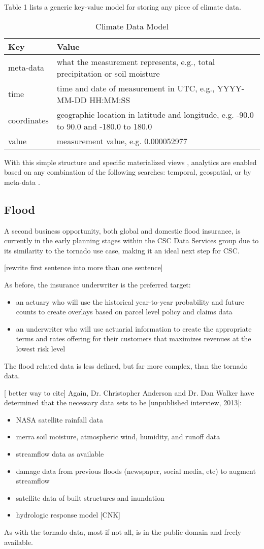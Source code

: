 Table 1 lists a generic key-value model for storing any piece of climate data.
\begin{table}[htbp]
	\caption{Climate Data Model}
	\centering
	\begin{tabular}{l l}
		\hline
		Key & Value \\ [0.5ex]
		\hline
		meta-data & what the measurement represents, e.g., total precipitation or soil moisture\\
		time & time and date of measurement in UTC, e.g., YYYY-MM-DD HH:MM:SS\\
		coordinates & geographic location in latitude and longitude, e.g. -90.0 to 90.0 and -180.0 to 180.0\\
		value & measurement value, e.g. 0.000052977\\
		\hline
	\end{tabular}
\end{table}
With this simple structure and specific materialized views ,  analytics are enabled based on any combination of the following searches: temporal, geospatial, or by meta-data \cite{materialized_views}. 
\subsection{Flood}
A second business opportunity, both global and domestic flood insurance, is currently in the early planning stages within the CSC Data Services group due to its similarity to the tornado use case, making it an ideal next step for CSC. 

[rewrite first sentence into more than one sentence]


 As before, the  insurance underwriter is the preferred target:
\begin{itemize}
    \item an actuary who will use the historical year-to-year probability and future counts to create overlays based on parcel level policy and claims data
    \item an underwriter who will use actuarial information to create the appropriate terms and rates offering for their customers that maximizes revenues at the lowest risk level
\end{itemize}
The flood related data is less defined, but far more complex, than the tornado data. 

[ better way to cite]
Again, Dr. Christopher Anderson and Dr. Dan Walker have determined that the necessary data sets to be [unpublished interview, 2013]:
\begin{itemize}
    \item NASA satellite rainfall data
    \item \gls{merra} soil moisture, atmospheric wind,  humidity, and runoff data
    \item streamflow data as available
    \item damage data from previous floods (newspaper, social media, etc) to augment streamflow
    \item satellite data of built structures and inundation
    \item hydrologic response model [CNK]
\end{itemize}
As with the tornado data, most if not all, is in the public domain and freely available.

